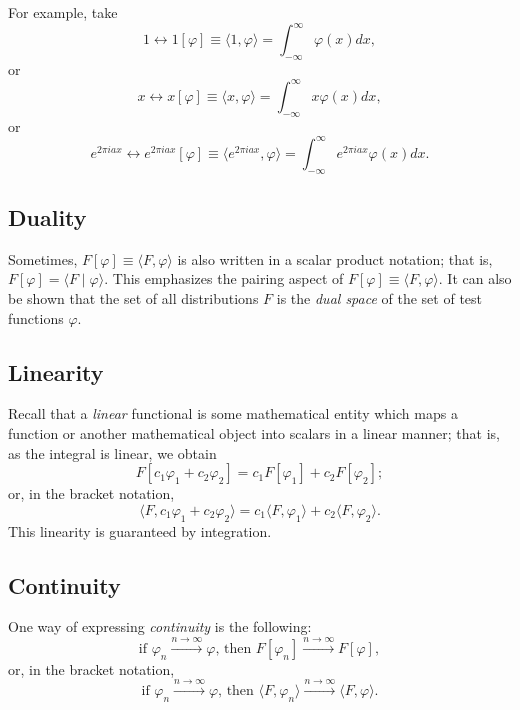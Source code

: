 {
\color{blue}
\bexample
For example, take
$$1 \longleftrightarrow 1 [\varphi ]\equiv \langle 1 , \varphi \rangle
=\int_{-\infty}^\infty
\varphi (x)
dx  , $$
or
$$x \longleftrightarrow x [\varphi ]\equiv \langle x , \varphi \rangle =\int_{-\infty}^\infty
x\varphi (x)
dx,$$
or
$$e^{2\pi i ax} \longleftrightarrow e^{2\pi i ax} [\varphi ]\equiv \langle e^{2\pi i ax}  ,
\varphi \rangle
=\int_{-\infty}^\infty
e^{2\pi i ax} \varphi (x)
dx  .$$
\eexample
}

\subsection{Duality}

Sometimes, $F[\varphi ]\equiv \langle F , \varphi \rangle $   is also written in a scalar product notation; that is,
$F[\varphi] =\langle F \mid \varphi \rangle$.
This emphasizes the pairing aspect of $F[\varphi ]\equiv \langle F , \varphi \rangle $.
It can also be shown that the set of all distributions $F$ is the {\em dual space} of the set of test functions $\varphi$.


\subsection{Linearity}


Recall that a {\em linear} functional is some mathematical entity which maps a function or another mathematical object
into scalars in a linear manner; that is, as the integral is linear, we obtain
\begin{equation}
F[c_1\varphi_1+c_2\varphi_2 ]=
c_1F[\varphi_1]  +
c_2F[\varphi_2];
\end{equation}
or, in the bracket notation,
\begin{equation}
\langle F ,   c_1\varphi_1+c_2\varphi_2 \rangle  =
c_1 \langle F ,  \varphi_1   \rangle  +
c_2 \langle F ,   \varphi_2   \rangle .
\end{equation}
This linearity is guaranteed by integration.

\subsection{Continuity}

One way of expressing {\em continuity} is
 the following:
\begin{equation}
\textrm{if }
\varphi_n \stackrel{n\rightarrow \infty}{\longrightarrow} \varphi
\textrm{, then }
F[\varphi_n ] \stackrel{n\rightarrow \infty}{\longrightarrow} F[\varphi  ],
\end{equation}
or, in the bracket notation,
\begin{equation}
\textrm{if }
\varphi_n \stackrel{n\rightarrow \infty}{\longrightarrow} \varphi
\textrm{, then }
\langle F ,    \varphi_n  \rangle \stackrel{n\rightarrow \infty}{\longrightarrow} \langle F ,    \varphi   \rangle .
\end{equation}


